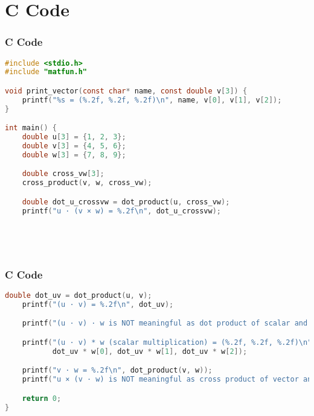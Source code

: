 \documentclass{beamer}
\numberwithin{equation}{section}
\begin{document}
\section{ C Code}
\begin{frame}[fragile]
\frametitle{C Code }
\begin{lstlisting}[language=C]
#include <stdio.h>
#include "matfun.h"

void print_vector(const char* name, const double v[3]) {
    printf("%s = (%.2f, %.2f, %.2f)\n", name, v[0], v[1], v[2]);
}

int main() {
    double u[3] = {1, 2, 3};
    double v[3] = {4, 5, 6};
    double w[3] = {7, 8, 9};

    double cross_vw[3];
    cross_product(v, w, cross_vw);

    double dot_u_crossvw = dot_product(u, cross_vw);
    printf("u · (v × w) = %.2f\n", dot_u_crossvw);


   
    
\end{lstlisting}
\end{frame}
\begin{frame}[fragile]
\frametitle{C Code }
\begin{lstlisting}[language=C]
 double dot_uv = dot_product(u, v);
    printf("(u · v) = %.2f\n", dot_uv);

    printf("(u · v) · w is NOT meaningful as dot product of scalar and vector.\n");

    printf("(u · v) * w (scalar multiplication) = (%.2f, %.2f, %.2f)\n",
           dot_uv * w[0], dot_uv * w[1], dot_uv * w[2]);

    printf("v · w = %.2f\n", dot_product(v, w));
    printf("u × (v · w) is NOT meaningful as cross product of vector and scalar.\n");

    return 0;
}


\end{lstlisting}
\end{frame}
\end{document}
